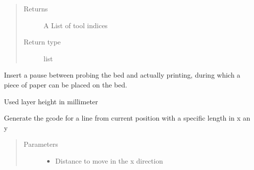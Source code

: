 \documentclass[letterpaper,10pt,english]{sphinxmanual}
\begin{document}
\begin{fulllineitems}
\begin{fulllineitems}
\begin{quote}
\begin{description}
\item[{Returns}] \leavevmode
\sphinxAtStartPar
A List of tool indices

\item[{Return type}] \leavevmode
\sphinxAtStartPar
list

\end{description}\end{quote}

\end{fulllineitems}


\begin{fulllineitems}
\label{\detokenize{index:generator.generator.insert_pause}}
\sphinxAtStartPar
Insert a pause between probing the bed and actually printing, during which a piece of paper can be placed on the bed.

\end{fulllineitems}


\begin{fulllineitems}
\label{\detokenize{index:generator.generator.layer_height}}
\sphinxAtStartPar
Used layer height in millimeter

\end{fulllineitems}


\begin{fulllineitems}
\label{\detokenize{index:generator.generator.line}}
\sphinxAtStartPar
Generate the gcode for a line from current position with a specific length in x an y
\begin{quote}\begin{description}
\item[{Parameters}] \leavevmode\begin{itemize}
\item {} 
\sphinxAtStartPar
{} \textendash{} Distance to move in the x direction


\end{itemize}
\end{description}
\end{quote}
\end{fulllineitems}
\end{fulllineitems}
\end{document}
